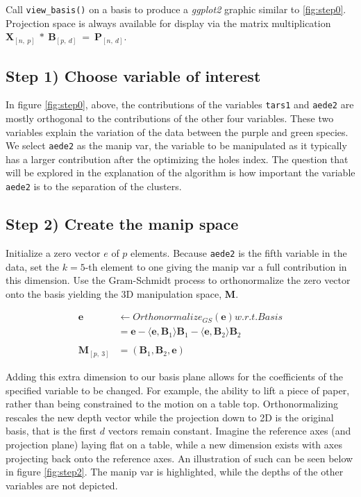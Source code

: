 \documentclass{monashthesis}
\theoremstyle{definition}
\theoremstyle{definition}
\theoremstyle{definition}
\theoremstyle{remark}
\begin{document}
Call \texttt{view\_basis()} on a basis to produce a \emph{ggplot2}
graphic similar to \ref{fig:step0}. Projection space is always available
for display via the matrix multiplication
\(\textbf{X}_{[n,~p]} ~*~ \textbf{B}_{[p,~d]} ~=~ \textbf{P}_{[n,~d]}\).

\subsection{Step 1) Choose variable of
interest}\label{step-1-choose-variable-of-interest}

In figure \ref{fig:step0}, above, the contributions of the variables
\texttt{tars1} and \texttt{aede2} are mostly orthogonal to the
contributions of the other four variables. These two variables explain
the variation of the data between the purple and green species. We
select \texttt{aede2} as the manip var, the variable to be manipulated
as it typically has a larger contribution after the optimizing the holes
index. The question that will be explored in the explanation of the
algorithm is how important the variable \texttt{aede2} is to the
separation of the clusters.

\subsection{Step 2) Create the manip
space}\label{step-2-create-the-manip-space}

Initialize a zero vector \(e\) of \(p\) elements. Because \texttt{aede2}
is the fifth variable in the data, set the \(k=5\)-th element to one
giving the manip var a full contribution in this dimension. Use the
Gram-Schmidt process to orthonormalize the zero vector onto the basis
yielding the 3D manipulation space, \textbf{M}.

\begin{align*}
  \textbf{e} &\leftarrow Orthonormalize_{GS}(\textbf{e}) w.r.t. Basis \\
  &= \textbf{e} - \langle \textbf{e},\textbf{B}_1 \rangle \textbf{B}_1 - \langle \textbf{e}, \textbf{B}_2 \rangle \textbf{B}_2 \\
  \\
  \textbf{M}_{[p,~3]} &= (\textbf{B}_1,\textbf{B}_2,\textbf{e})
\end{align*}

Adding this extra dimension to our basis plane allows for the
coefficients of the specified variable to be changed. For example, the
ability to lift a piece of paper, rather than being constrained to the
motion on a table top. Orthonormalizing rescales the new depth vector
while the projection down to 2D is the original basis, that is the first
\(d\) vectors remain constant. Imagine the reference axes (and
projection plane) laying flat on a table, while a new dimension exists
with axes projecting back onto the reference axes. An illustration of
such can be seen below in figure \ref{fig:step2}. The manip var is
highlighted, while the depths of the other variables are not depicted.
\end{document}
